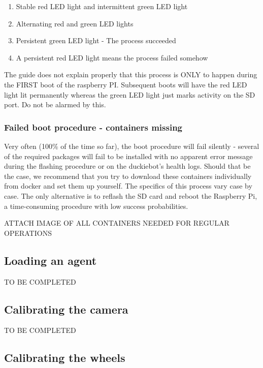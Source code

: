\documentclass[12pt]{article}
\begin{document}
\begin{enumerate}
    \item Stable red LED light and intermittent green LED light
    \item Alternating red and green LED lights
    \item Persistent green LED light - The process succeeded
    \item A persistent red LED light means the process failed somehow
\end{enumerate}

The guide does not explain properly that this process is ONLY to happen during the FIRST boot of the raspberry PI. Subsequent boots will have the red LED light lit permanently whereas the green LED light just marks activity on the SD port. Do not be alarmed by this.

\subsubsection{Failed boot procedure - containers missing}

Very often (100\% of the time so far), the boot procedure will fail silently - several of the required packages will fail to be installed with no apparent error message during the flashing procedure or on the duckiebot's health logs. Should that be the case, we recommend that you try to download these containers individually from docker and set them up yourself. The specifics of this process vary case by case. The only alternative is to reflash the SD card and reboot the Raspberry Pi, a time-consuming procedure with low success probabilities.

ATTACH IMAGE OF ALL CONTAINERS NEEDED FOR REGULAR OPERATIONS

\subsection{Loading an agent}

TO BE COMPLETED

\subsection{Calibrating the camera}

TO BE COMPLETED

\subsection{Calibrating the wheels}
\end{document}
